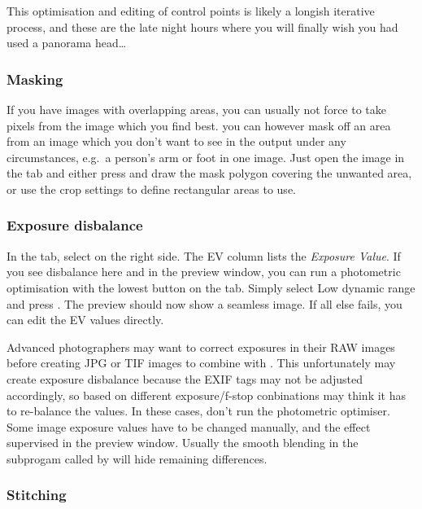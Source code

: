 This optimisation and editing of control points is likely a longish
iterative process, and these are the late night hours where you will
finally wish you had used a panorama head\ldots



\subsubsection{Masking}
\label{sec:landscapes:Masking}

If you have images with overlapping areas, you can usually not force
 to take pixels from the image which you find best. you can
however mask off an area from an image which you don't want to see in
the output under any circumstances, e.g.\ a person's arm or foot in
one image. Just open the image in the  tab and either press
 and draw the mask polygon covering the unwanted
area, or use the crop settings to define rectangular areas to use.

\subsubsection{Exposure disbalance}
\label{sec:landscapes:Exposure}
In the  tab, select  on the right
side. The EV column lists the \emph{Exposure Value}. If you see disbalance
here and in the preview window, you can run a photometric optimisation
with the lowest button on the  tab. Simply select Low dynamic
range and press . The preview should now show a seamless
image. If all else fails, you can edit the EV values directly.

Advanced photographers may want to correct exposures in their RAW
images before creating JPG or TIF images to combine with
. This unfortunately may create exposure disbalance
because the EXIF tags may not be adjusted accordingly, so based on
different exposure/f-stop conbinations  may think it
has to re-balance the values. In these cases, don't run the
photometric optimiser. Some image exposure values have to be changed
manually, and the effect supervised in the preview window. Usually the
smooth blending in the subprogam  called by
 will hide remaining differences.



\subsubsection{Stitching}
\label{sec:landscapes:stitching}

